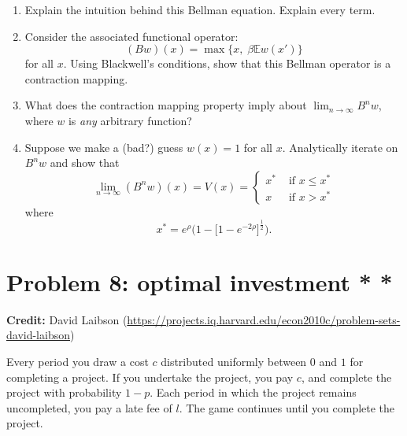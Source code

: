 \documentclass[11pt]{extarticle}
\theoremstyle{plain}
\theoremstyle{definition}
\begin{document}
\vspace{5mm}
\begin{enumerate}
\item Explain the intuition behind this Bellman equation. Explain every term.

\item Consider the associated functional operator:
\begin{equation*}
	(Bw)(x) = \max \bigg\{ x, \; \beta \mathbb E w(x') \bigg\}
\end{equation*}
for all $x$. Using Blackwell's conditions, show that this Bellman operator is a contraction mapping. 

\item What does the contraction mapping property imply about $\lim_{n \to \infty} B^n w$, where $w$ is \textit{any} arbitrary function? 

\item Suppose we make a (bad?) guess $w(x) = 1$ for all $x$. Analytically iterate on $B^n w$ and show that 
\begin{equation*}
	\lim_{n \to \infty} (B^n w) (x) = V(x) = \begin{cases}
		x^* & \text { if } x \leq x^* \\
		x & \text { if } x > x^*
	\end{cases}
\end{equation*}
where
\begin{equation*}
	x^* = e^\rho \bigg( 1 - \Big[ 1 - e^{- 2 \rho} \Big]^\frac{1}{2} \bigg).
\end{equation*}
\end{enumerate}


\vspace{10mm}
\section*{Problem 8: optimal investment * *}

\textbf{Credit:} David Laibson (\url{https://projects.iq.harvard.edu/econ2010c/problem-sets-david-laibson})

\vspace{5mm}
\noindent
Every period you draw a cost $c$ distributed uniformly between $0$ and $1$ for completing a project. If you undertake the project, you pay $c$, and complete the project with probability $1-p$. Each period in which the project remains uncompleted, you pay a late fee of $l$. The game continues until you complete the project.
\end{document}
